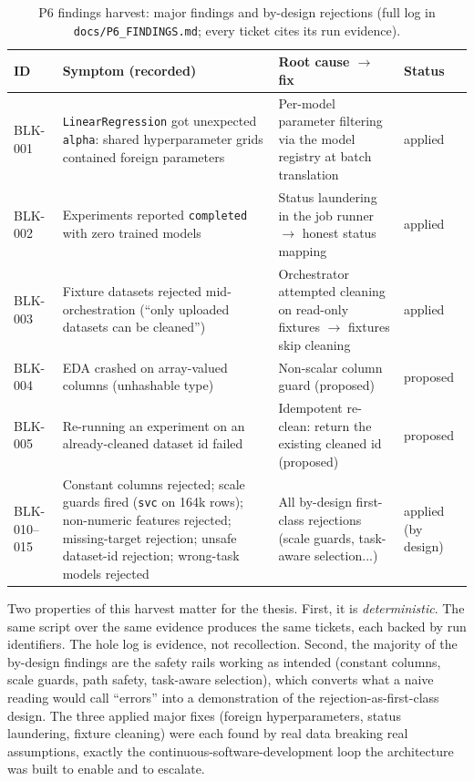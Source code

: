 \begin{table}[H]
\centering
\caption{P6 findings harvest: major findings and by-design rejections (full log in \texttt{docs/P6\_FINDINGS.md}; every ticket cites its run evidence).}
\label{tab:p6findings}
\small
\begin{tabular}{p{1.8cm}p{5.6cm}p{5.4cm}p{1.6cm}}
\toprule
\textbf{ID} & \textbf{Symptom (recorded)} & \textbf{Root cause $\rightarrow$ fix} & \textbf{Status} \\
\midrule
BLK-001 & \texttt{LinearRegression} got unexpected \texttt{alpha}: shared hyperparameter grids contained foreign parameters & Per-model parameter filtering via the model registry at batch translation & applied \\
BLK-002 & Experiments reported \texttt{completed} with zero trained models & Status laundering in the job runner $\rightarrow$ honest status mapping & applied \\
BLK-003 & Fixture datasets rejected mid-orchestration (``only uploaded datasets can be cleaned'') & Orchestrator attempted cleaning on read-only fixtures $\rightarrow$ fixtures skip cleaning & applied \\
BLK-004 & EDA crashed on array-valued columns (unhashable type) & Non-scalar column guard (proposed) & proposed \\
BLK-005 & Re-running an experiment on an already-cleaned dataset id failed & Idempotent re-clean: return the existing cleaned id (proposed) & proposed \\
\midrule
BLK-010--015 & Constant columns rejected; scale guards fired (\texttt{svc} on 164k rows); non-numeric features rejected; missing-target rejection; unsafe dataset-id rejection; wrong-task models rejected & All by-design first-class rejections (scale guards, task-aware selection...) & applied (by design) \\
\bottomrule
\end{tabular}
\end{table}

Two properties of this harvest matter for the thesis. First, it is \emph{deterministic}. The same script over the same evidence produces the same tickets, each backed by run identifiers. The hole log is evidence, not recollection. Second, the majority of the by-design findings are the safety rails working as intended (constant columns, scale guards, path safety, task-aware selection), which converts what a naive reading would call ``errors'' into a demonstration of the rejection-as-first-class design. The three applied major fixes (foreign hyperparameters, status laundering, fixture cleaning) were each found by real data breaking real assumptions, exactly the continuous-software-development loop the architecture was built to enable and to escalate.
